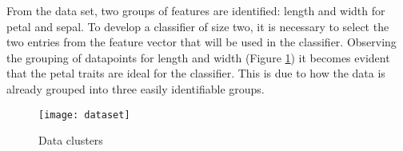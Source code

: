 From the data set, two groups of features are identified: length and width for petal and sepal.
To develop a classifier of size two, it is necessary to select the two entries from the feature vector
that will be used in the classifier.
Observing the grouping of datapoints for length and width
(Figure \ref{fig: dataset}) it becomes evident that the petal traits are ideal for the classifier.
This is due to how the data is already grouped into three easily identifiable groups.

\begin{figure}[htb!]
\centering
 \texttt{[image: dataset]}
 \caption{Data clusters}
 \label{fig: dataset}
\end{figure}

